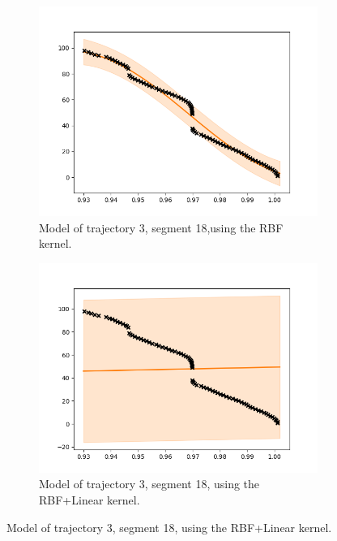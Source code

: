 \begin{figure}
    \centering
    \begin{subfigure}[b]{0.475\textwidth}
        \centering
        \includegraphics[width=\textwidth]{figures/forecasting/gp_3_18_rbf}
        \caption[]%
        {{\small Model of trajectory 3, segment 18,using the RBF kernel.}}    
        \label{fig:3-18-rbf}
    \end{subfigure}
    \hfill
    \begin{subfigure}[b]{0.475\textwidth}  
        \centering 
        \includegraphics[width=\textwidth]{figures/forecasting/gp_3_18_rbf_linear}
        \caption[]%
        {{\small Model of trajectory 3, segment 18, using the RBF+Linear kernel.}}    

\end{subfigure}
\end{figure}
